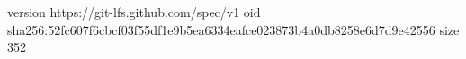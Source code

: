 version https://git-lfs.github.com/spec/v1
oid sha256:52fc607f6cbcf03f55df1e9b5ea6334eafce023873b4a0db8258e6d7d9e42556
size 352

